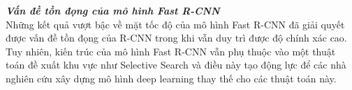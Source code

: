 {    \noindent
    \textbf{\textit{Vấn đề tồn đọng của mô hình Fast R-CNN}} \\
    Những kết quả vượt bậc về mặt tốc độ của mô hình Fast R-CNN đã giải quyết được vấn đề tồn đọng của R-CNN trong khi vẫn duy trì được độ chính xác cao.
    Tuy nhiên, kiến trúc của mô hình Fast R-CNN vẫn phụ thuộc vào một thuật toán đề xuất khu vực như Selective Search và điều này tạo động lực để các nhà nghiên cứu xây dựng mô hình deep learning thay thế cho các thuật toán này.
}